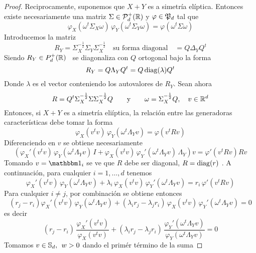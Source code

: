 \begin{proof}
  Reciprocamente,  suponemos  que $X+Y$  es  a  simetr\'ia el\'iptica.  Entonces
  existe  necesariamente una matriz  $\Sigma \in  \mathcal{P}_d^+(\mathbb{R})$ y  $\varphi \in
  \mathfrak{P}_d$ tal que
  \[
  \varphi_X\left(  \omega^t \Sigma_X  \omega\right) \,  \varphi_Y\left( \omega^t
    \Sigma_Y \omega\right) = \varphi\left( \omega^t \Sigma \omega\right)
  \]
  Introducemos la matriz
  \[
  R_Y  = \Sigma_X^{-\frac12} \Sigma_Y  \Sigma_X^{-\frac12} \quad  \mbox{su forma
    diagonal} \quad = Q \Delta_Y Q^t
  \]
  Siendo  $R_Y \in  P_d^+(\mathbb{R})$ \  se diagonaliza  con $Q$  ortogonal  bajo la
  forma~\cite{Bha97, Bha07, HorJoh13}
  \[
  R_Y = Q \Lambda_Y Q^t = Q \operatorname{diag}(\lambda) Q^t
  \]
  Donde $\lambda$ es el vector conteniendo los autovalores de $R_Y$. Sean ahora
  \[
  R  =  Q^t \Sigma_X^{-\frac12}  \Sigma  \Sigma_X^{-\frac12}  Q \qquad  \mbox{y}
  \qquad \omega = \Sigma_X^{-\frac12} Q, \quad v \in \mathbb{R}^d
  \]
  Entonces,  si $X+Y$  es  a  simetr\'ia eli\'iptica,  la  relaci\'on entre  las
  generadoras caracter\'isticas debe tomar la forma
  \[
  \varphi_X\left( v^t v \right)  \, \varphi_Y\left( \omega^t \Lambda_Y v \right)
  = \varphi\left( v^t R v \right)
  \]
  Diferenciendo en $v$ se obtiene necesariamente
  \[
  \left( \varphi_X'\left( v^t v  \right) \, \varphi_Y\left( \omega^t \Lambda_Y v
    \right) \,  I + \varphi_X\left(  v^t v \right) \,  \varphi_Y'\left( \omega^t
      \Lambda_Y  v \right)  \,  \Lambda_Y \right)  v  = \varphi'\left(  v^t R  v
  \right) R v
  \]
  Tomando $v =  \un_i$ se ve que  $R$ debe ser diagonal, $R  = \operatorname{diag}(r)$ .  A  continuaci\'on, para  cualquier $i =1  , \ldots  , d$
  tenemos
  \[
  \varphi_X'\left( v^t v \right) \, \varphi_Y\left( \omega^t \Lambda_Y v \right)
  +  \lambda_i \,  \varphi_X\left( v^t  v \right)  \,  \varphi_Y'\left( \omega^t
    \Lambda_Y v \right) = r_i \, \varphi'\left( v^t R v \right)
  \]
  Para cualquier $i \ne j$, por combinaci\'on se obtiene entonces
  \[
  (r_j-r_i) \varphi_X'\left( v^t v \right) \, \varphi_Y\left( \omega^t \Lambda_Y
    v \right) + (\lambda_i r_j - \lambda_j r_i) \, \varphi_X\left( v^t v \right)
  \, \varphi_Y'\left( \omega^t \Lambda_Y v \right) = 0
  \]
  es decir
  \[
  (r_j-r_i) \, \frac{\varphi_X'\left( v^t v \right)}{\varphi_X\left( v^t v \right)}
  +  (\lambda_i r_j - \lambda_j r_i) \,  \frac{\varphi_Y'\left( \omega^t
    \Lambda_Y v \right)}{\varphi_Y\left( \omega^t
    \Lambda_Y v \right)} = 0
  \]
  Tomamos $v  \in \mathbb{S}_d, \:\: w  > 0$ dando  el prim\'er t\'ermino de  la suma

\end{proof}
